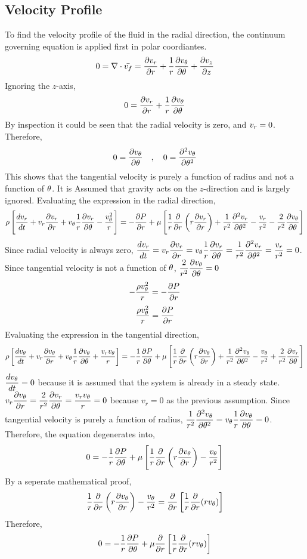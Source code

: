 \documentclass[a4paper, 12pt]{report}
\begin{document}
\begin{center}
\subsection{Velocity Profile}
\begin{comment}
\end{comment}
To find the velocity profile of the fluid in the radial direction, the continuum governing equation is applied first in polar coordiantes.
$$0 = \nabla\cdot\bar{v_f} = \frac{\partial v_r}{\partial r} + \frac{1}{r}\frac{\partial v_\theta}{\partial\theta} + \frac{\partial v_z}{\partial z}$$
Ignoring the $z$-axis,
$$0 = \frac{\partial v_r}{\partial r} + \frac{1}{r}\frac{\partial v_\theta}{\partial\theta}$$
By inspection it could be seen that the radial velocity is zero, and $\displaystyle{v_r = 0}$. Therefore,
$$0 = \frac{\partial v_\theta}{\partial\theta}\quad,\quad 0 = \frac{\partial^2 v_\theta}{\partial\theta^2}$$
This shows that the tangential velocity is purely a function of radius and not a function of $\theta$. It is Assumed that gravity acts on the $z$-direction and is largely ignored. 
Evaluating the expression in the radial direction,
$$\rho\left[\frac{dv_r}{dt} + v_r\frac{\partial v_r}{\partial r} + v_\theta\frac{1}{r}\frac{\partial v_r}{\partial\theta} - \frac{v_\theta^2}{r}\right] = - \frac{\partial P}{\partial r} + \mu\left[\frac{1}{r}\frac{\partial}{\partial r}\left(r\frac{\partial v_r}{\partial r}\right) + \frac{1}{r^2}\frac{\partial^2 v_r}{\partial \theta^2} - \frac{v_r}{r^2} - \frac{2}{r^2}\frac{\partial v_\theta}{\partial\theta}\right]$$
Since radial velocity is always zero, $\displaystyle{\frac{dv_r}{dt} = v_r\frac{\partial v_r}{\partial r} = v_\theta\frac{1}{r}\frac{\partial v_r}{\partial\theta} = \frac{1}{r^2}\frac{\partial^2 v_r}{\partial\theta^2} = \frac{v_r}{r^2} = 0}$. Since tangential velocity is not a function of $\theta$, $\displaystyle{\frac{2}{r^2}\frac{\partial v_\theta}{\partial\theta} = 0}$
$$- \frac{\rho v_\theta^2}{r} = - \frac{\partial P}{\partial r}$$
$$\frac{\rho v_\theta^2}{r} = \frac{\partial P}{\partial r}$$
Evaluating the expression in the tangential direction,
$$\rho\left[\frac{dv_\theta}{dt} + v_r\frac{\partial v_\theta}{\partial r} + v_\theta\frac{1}{r}\frac{\partial v_\theta}{\partial\theta} + \frac{v_rv_\theta}{r}\right] = - \frac{1}{r}\frac{\partial P}{\partial\theta} + \mu\left[\frac{1}{r}\frac{\partial}{\partial r}\left(r\frac{\partial v_\theta}{\partial r}\right) + \frac{1}{r^2}\frac{\partial^2 v_\theta}{\partial \theta^2} - \frac{v_\theta}{r^2} + \frac{2}{r^2}\frac{\partial v_r}{\partial\theta}\right]$$
$\displaystyle{\frac{dv_\theta}{dt} = 0}$ because it is assumed that the system is already in a steady state. $\displaystyle{v_r\frac{\partial v_\theta}{\partial r} = \frac{2}{r^2}\frac{\partial v_r}{\partial\theta}  = \frac{v_rv_\theta}{r}= 0}$ because $v_r = 0$ as the previous assumption. Since tangential velocity is purely a function of radius, $\displaystyle{\frac{1}{r^2}\frac{\partial^2 v_\theta}{\partial\theta^2} = v_\theta\frac{1}{r}\frac{\partial v_\theta}{\partial\theta} = 0}$. Therefore, the equation degenerates into,
$$0 = - \frac{1}{r}\frac{\partial P}{\partial\theta} + \mu\left[\frac{1}{r}\frac{\partial}{\partial r}\left(r\frac{\partial v_\theta}{\partial r}\right) - \frac{v_\theta}{r^2}\right]$$
By a seperate mathematical proof,
$$\frac{1}{r}\frac{\partial}{\partial r}\left(r\frac{\partial v_\theta}{\partial r}\right) - \frac{v_\theta}{r^2} = \frac{\partial}{\partial r}\left[\frac{1}{r}\frac{\partial}{\partial r}(rv_\theta)\right]$$
Therefore,
$$0 = - \frac{1}{r}\frac{\partial P}{\partial\theta} + \mu\frac{\partial}{\partial r}\left[\frac{1}{r}\frac{\partial}{\partial r}(rv_\theta)\right]$$

\end{center}
\end{document}
